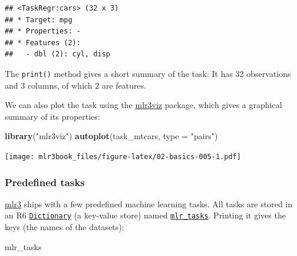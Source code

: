 \documentclass[]{article}
\newenvironment{Shaded}{\begin{snugshade}}{\end{snugshade}}
\newcommand{\DataTypeTok}[1]{\textcolor[rgb]{0.13,0.29,0.53}{#1}}
\newcommand{\KeywordTok}[1]{\textcolor[rgb]{0.13,0.29,0.53}{\textbf{#1}}}
\newcommand{\NormalTok}[1]{#1}
\newcommand{\OperatorTok}[1]{\textcolor[rgb]{0.81,0.36,0.00}{\textbf{#1}}}
\newcommand{\StringTok}[1]{\textcolor[rgb]{0.31,0.60,0.02}{#1}}
\renewenvironment{Shaded} {\begin{snugshade}\small} {\end{snugshade}}
\begin{document}
\begin{Shaded}
\end{Shaded}

\begin{verbatim}
## <TaskRegr:cars> (32 x 3)
## * Target: mpg
## * Properties: -
## * Features (2):
##   - dbl (2): cyl, disp
\end{verbatim}

The \texttt{print()} method gives a short summary of the task:
It has 32 observations and 3 columns, of which 2 are features.

We can also plot the task using the \href{https://mlr3viz.mlr-org.com}{mlr3viz} package, which gives a graphical summary of its properties:

\begin{Shaded}
\begin{Highlighting}[]
\KeywordTok{library}\NormalTok{(}\StringTok{"mlr3viz"}\NormalTok{)}
\KeywordTok{autoplot}\NormalTok{(task_mtcars, }\DataTypeTok{type =} \StringTok{"pairs"}\NormalTok{)}
\end{Highlighting}
\end{Shaded}

\texttt{[image: mlr3book\_files/figure-latex/02-basics-005-1.pdf]}

\hypertarget{tasks-predefined}{%
\subsubsection{Predefined tasks}\label{tasks-predefined}}

\href{https://mlr3.mlr-org.com}{mlr3} ships with a few predefined machine learning tasks.
All tasks are stored in an R6 \href{https://mlr3misc.mlr-org.com/reference/Dictionary.html}{\texttt{Dictionary}} (a key-value store) named \href{https://mlr3.mlr-org.com/reference/mlr_tasks.html}{\texttt{mlr\_tasks}}.
Printing it gives the keys (the names of the datasets):

\begin{Shaded}
\begin{Highlighting}[]
\NormalTok{mlr_tasks}
\end{Highlighting}
\end{Shaded}
\end{document}
